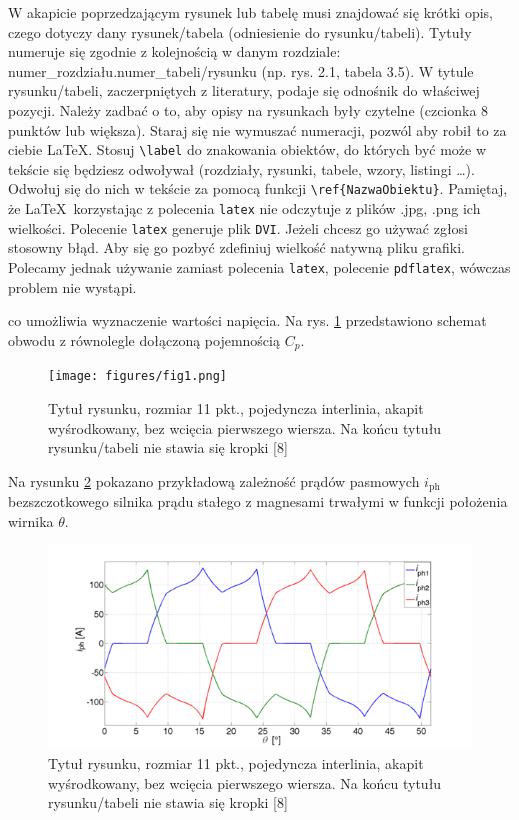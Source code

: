 \documentclass[12pt,twoside]{article}
\begin{document}
W akapicie poprzedzającym rysunek lub tabelę musi znajdować się krótki opis, czego dotyczy dany rysunek/tabela (odniesienie do rysunku/tabeli). Tytuły numeruje się zgodnie z kolejnością w danym rozdziale: numer\_rozdziału.numer\_tabeli/rysunku (np. rys. 2.1, tabela 3.5). W tytule rysunku/tabeli, zaczerpniętych z literatury, podaje się odnośnik do właściwej pozycji. Należy zadbać o to, aby opisy na rysunkach były czytelne (czcionka 8 punktów lub większa). Staraj się nie wymuszać numeracji, pozwól aby robił to za ciebie \LaTeX. Stosuj \verb!\label! do znakowania obiektów, do których być może w tekście się będziesz odwoływał (rozdziały, rysunki, tabele, wzory, listingi \ldots). Odwołuj się do nich w tekście  za pomocą funkcji \verb!\ref{NazwaObiektu}!. Pamiętaj, że \LaTeX\, korzystając z polecenia \verb|latex| nie odczytuje z plików .jpg, .png ich wielkości. Polecenie \verb|latex| generuje plik \verb|DVI|. Jeżeli chcesz go używać zgłosi stosowny błąd. Aby się go pozbyć zdefiniuj wielkość natywną pliku grafiki. Polecamy jednak używanie zamiast polecenia \verb|latex|, polecenie \verb|pdflatex|, wówczas problem nie wystąpi.\\

\begin{example}
[\ldots] co umożliwia wyznaczenie wartości napięcia. Na rys. \ref{Fig:schemat} przedstawiono schemat obwodu z równolegle dołączoną pojemnością $C_p$.
\end{example}

\begin{figure}[ht]
	\centering
	\texttt{[image: figures/fig1.png]}
	\caption{Tytuł rysunku, rozmiar 11 pkt., pojedyncza interlinia, akapit wyśrodkowany, bez wcięcia pierwszego wiersza. Na końcu tytułu rysunku/tabeli nie stawia się kropki [8]}
\label{Fig:schemat}
\end{figure}

\begin{example}
[\ldots] Na rysunku \ref{Fig:wykres} pokazano przykładową zależność prądów pasmowych $i_\mathrm{ph}$ bezszczotkowego silnika prądu stałego z magnesami trwałymi w funkcji położenia wirnika $\theta$.
\end{example}

\begin{figure}[ht]
	\centering
	\includegraphics[width=12cm]{figures/fig2.png}
	\caption{Tytuł rysunku, rozmiar 11 pkt., pojedyncza interlinia, akapit wyśrodkowany, bez wcięcia pierwszego wiersza. Na końcu tytułu rysunku/tabeli nie stawia się kropki [8]}
\label{Fig:wykres}
\end{figure}
\end{document}
